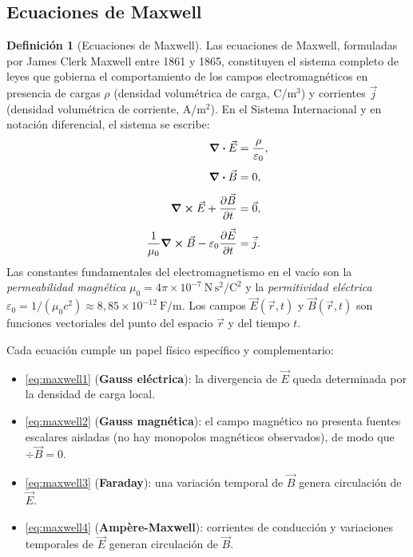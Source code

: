 \documentclass[12pt, a4paper]{article}
\theoremstyle{plain}
\theoremstyle{definition}
\newtheorem{definicion}[teorema]{Definición}
\theoremstyle{remark}
\newcommand{\ve}[1]{\vec{#1}}
\begin{document}
\subsection{Ecuaciones de Maxwell}

\begin{definicion}[Ecuaciones de Maxwell]
Las ecuaciones de Maxwell, formuladas por James Clerk Maxwell entre 1861 y 1865,
constituyen el sistema completo de leyes que gobierna el comportamiento de los
campos electromagnéticos en presencia de cargas $\rho$ (densidad volumétrica de
carga, C/m$^{3}$) y corrientes $\ve{j}$ (densidad volumétrica de corriente,
A/m$^{2}$). En el Sistema Internacional y en notación diferencial, el sistema
se escribe:
\begin{align}
  \div \ve{E} &= \frac{\rho}{\varepsilon_0}, \label{eq:maxwell1}\\[4pt]
  \div \ve{B} &= 0, \label{eq:maxwell2}\\[4pt]
  \curl \ve{E} + \pdv{\ve{B}}{t} &= \ve{0}, \label{eq:maxwell3}\\[4pt]
  \frac{1}{\mu_0}\curl \ve{B} - \varepsilon_0 \pdv{\ve{E}}{t} &= \ve{j}.
  \label{eq:maxwell4}
\end{align}
Las constantes fundamentales del electromagnetismo en el vacío son la
\emph{permeabilidad magnética} $\mu_0 = 4\pi\times10^{-7}\ \mathrm{N\,s^2/C^2}$
y la \emph{permitividad eléctrica} $\varepsilon_0 = 1/(\mu_0 c^2) \approx
8{,}85\times10^{-12}\ \mathrm{F/m}$.
Los campos $\ve{E}(\ve{r},t)$ y $\ve{B}(\ve{r},t)$ son funciones vectoriales
del punto del espacio $\ve{r}$ y del tiempo $t$.

Cada ecuación cumple un papel físico específico y complementario:
\begin{itemize}
  \item \eqref{eq:maxwell1} (\textbf{Gauss eléctrica}): la divergencia de
        $\ve{E}$ queda determinada por la densidad de carga local.
  \item \eqref{eq:maxwell2} (\textbf{Gauss magnética}): el campo magnético no
        presenta fuentes escalares aisladas (no hay monopolos magnéticos
        observados), de modo que $\div\ve{B}=0$.
  \item \eqref{eq:maxwell3} (\textbf{Faraday}): una variación temporal de
        $\ve{B}$ genera circulación de $\ve{E}$.
  \item \eqref{eq:maxwell4} (\textbf{Ampère-Maxwell}): corrientes de conducción
        y variaciones temporales de $\ve{E}$ generan circulación de $\ve{B}$.
\end{itemize}
\end{definicion}
\end{document}
